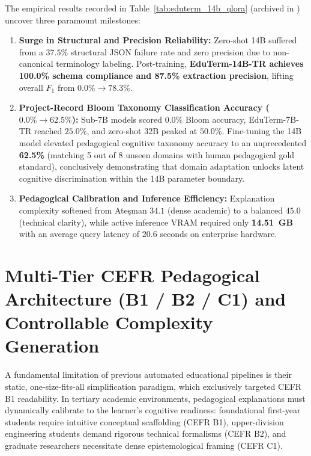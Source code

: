 \documentclass[a4paper,12pt]{report}
\begin{document}
The empirical results recorded in Table~\ref{tab:eduterm_14b_qlora} (archived in ) uncover three paramount milestones:
\begin{enumerate}
    \item \textbf{Surge in Structural and Precision Reliability:} Zero-shot 14B suffered from a $37.5\%$ structural JSON failure rate and zero precision due to non-canonical terminology labeling. Post-training, \textbf{EduTerm-14B-TR achieves 100.0\% schema compliance and 87.5\% extraction precision}, lifting overall $F_1$ from $0.0\% \to 78.3\%$.
    \item \textbf{Project-Record Bloom Taxonomy Classification Accuracy ($0.0\% \to 62.5\%$):} Sub-7B models scored $0.0\%$ Bloom accuracy, EduTerm-7B-TR reached $25.0\%$, and zero-shot 32B peaked at $50.0\%$. Fine-tuning the 14B model elevated pedagogical cognitive taxonomy accuracy to an unprecedented \textbf{62.5\%} (matching 5 out of 8 unseen domains with human pedagogical gold standard), conclusively demonstrating that domain adaptation unlocks latent cognitive discrimination within the 14B parameter boundary.
    \item \textbf{Pedagogical Calibration and Inference Efficiency:} Explanation complexity softened from Ate\c{s}man $34.1$ (dense academic) to a balanced $45.0$ (technical clarity), while active inference VRAM required only \textbf{14.51~GB} with an average query latency of $20.6$ seconds on enterprise hardware.
\end{enumerate}

\section{Multi-Tier CEFR Pedagogical Architecture (B1 / B2 / C1) and Controllable Complexity Generation}
\label{sec:multi_tier_cefr}

A fundamental limitation of previous automated educational pipelines is their static, one-size-fits-all simplification paradigm, which exclusively targeted CEFR B1 readability. In tertiary academic environments, pedagogical explanations must dynamically calibrate to the learner's cognitive readiness: foundational first-year students require intuitive conceptual scaffolding (CEFR B1), upper-division engineering students demand rigorous technical formalisms (CEFR B2), and graduate researchers necessitate dense epistemological framing (CEFR C1).
\end{document}

